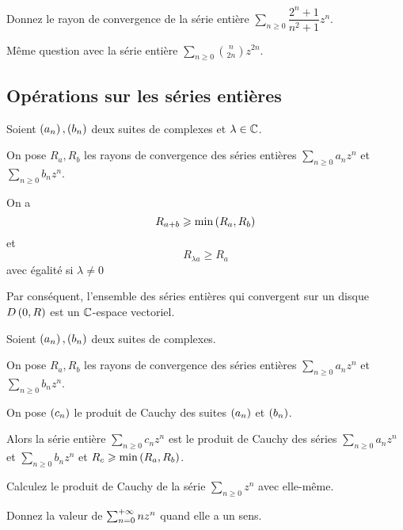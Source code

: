 \begin{exo}
Donnez le rayon de convergence de la série entière \(\sum_{n\geq0}\dfrac{2^n+1}{n^2+1}z^n\).
\end{exo}

\begin{exo}
Même question avec la série entière \(\sum_{n\geq0}\binom{n}{2n}z^{2n}\).
\end{exo}

\subsection{Opérations sur les séries entières}

\begin{prop}
Soient \(\left(a_n\right),\left(b_n\right)\) deux suites de complexes et \(\lambda\in\mathbb{C}\).

On pose \(R_a,R_b\) les rayons de convergence des séries entières \(\sum_{n\geq0}a_nz^n\) et \(\sum_{n\geq0}b_nz^n\).

On a \[R_{a+b}\geqslant\min\left(R_a,R_b\right)\] et \[R_{\lambda a}\geq R_a\] avec égalité si \(\lambda\not=0\)
\end{prop}

Par conséquent, l'ensemble des séries entières qui convergent sur un disque \(D\left(0,R\right)\) est un \(\mathbb{C}\)-espace vectoriel.

\begin{prop}
Soient \(\left(a_n\right),\left(b_n\right)\) deux suites de complexes.

On pose \(R_a,R_b\) les rayons de convergence des séries entières \(\sum_{n\geq0}a_nz^n\) et \(\sum_{n\geq0}b_nz^n\).

On pose \(\left(c_n\right)\) le produit de Cauchy des suites \(\left(a_n\right)\) et \(\left(b_n\right)\).

Alors la série entière \(\sum_{n\geq0}c_nz^n\) est le produit de Cauchy des séries \(\sum_{n\geq0}a_nz^n\) et \(\sum_{n\geq0}b_nz^n\) et \(R_c\geqslant\min\left(R_a,R_b\right)\).
\end{prop}

\begin{exo}
Calculez le produit de Cauchy de la série \(\sum_{n\geq0}z^n\) avec elle-même.

Donnez la valeur de \(\sum_{n=0}^{+\infty}nz^n\) quand elle a un sens.
\end{exo}

